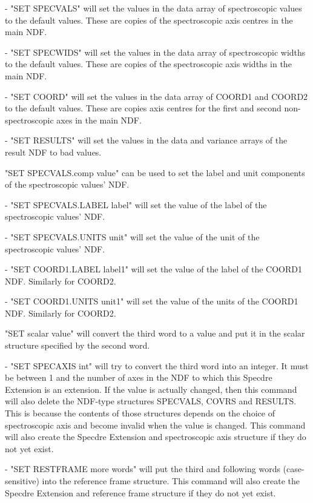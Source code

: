 \begin{description}
\begin{description}
   -  "SET SPECVALS" will set the values in the data array of
      spectroscopic values to the default values. These are copies
      of the spectroscopic axis centres in the main NDF.

   -  "SET SPECWIDS" will set the values in the data array of
      spectroscopic widths to the default values. These are copies
      of the spectroscopic axis widths in the main NDF.

   -  "SET COORD" will set the values in the data array of
      COORD1 and COORD2 to the default values. These are copies
      axis centres for the first and second non-spectroscopic axes
      in the main NDF.

   -  "SET RESULTS" will set the values in the data and variance
      arrays of the result NDF to bad values.

   "SET SPECVALS.comp value" can be used to set the label and unit
   components of the spectroscopic values' NDF.

   -  "SET SPECVALS.LABEL label" will set the value of the label
      of the spectroscopic values' NDF.

   -  "SET SPECVALS.UNITS unit" will set the value of the unit of
      the spectroscopic values' NDF.

   -  "SET COORD1.LABEL label1" will set the value of the label
      of the COORD1 NDF. Similarly for COORD2.

   -  "SET COORD1.UNITS unit1" will set the value of the units of
      the COORD1 NDF. Similarly for COORD2.

   "SET scalar value" will convert the third word to a value and
   put it in the scalar structure specified by the second word.

   -  "SET SPECAXIS int" will try to convert the third word into
      an integer. It must be between 1 and the number of axes in
      the NDF to which this Specdre Extension is an extension. If
      the value is actually changed, then this command will also
      delete the NDF-type structures SPECVALS, COVRS and RESULTS.
      This is because the contents of those structures depends on
      the choice of spectroscopic axis and become invalid when the
      value is changed. This command will also create the Specdre
      Extension and spectroscopic axis structure if they do not
      yet exist.

   -  "SET RESTFRAME more words" will put the third and following
      words (case-sensitive) into the reference frame structure.
      This command will also create the Specdre Extension and
      reference frame structure if they do not yet exist.


\end{description}
\end{description}
